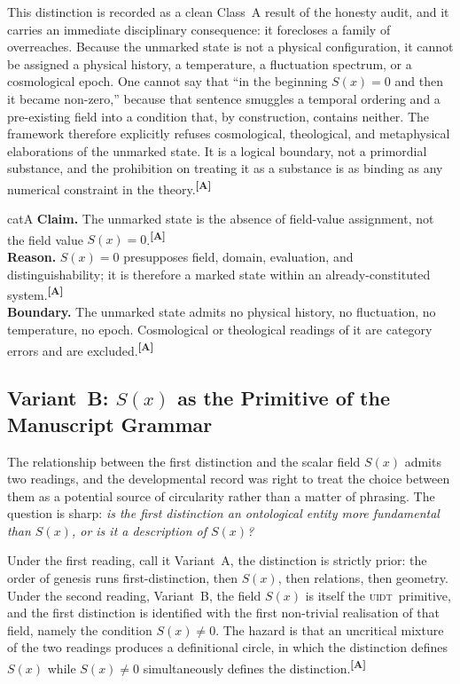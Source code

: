 \documentclass[12pt,a4paper,twoside]{article}
\theoremstyle{plain}
\theoremstyle{definition}
\theoremstyle{remark}
\newcommand{\UIDT}{\textsc{uidt}}
\newcommand{\catmark}[1]{\textsuperscript{\textsf{\textbf{[#1]}}}}
\begin{document}
This distinction is recorded as a clean Class~A result of the honesty audit, and it carries an immediate disciplinary consequence: it forecloses a family of overreaches. Because the unmarked state is not a physical configuration, it cannot be assigned a physical history, a temperature, a fluctuation spectrum, or a cosmological epoch. One cannot say that ``in the beginning $S(x)=0$ and then it became non-zero,'' because that sentence smuggles a temporal ordering and a pre-existing field into a condition that, by construction, contains neither. The framework therefore explicitly refuses cosmological, theological, and metaphysical elaborations of the unmarked state. It is a logical boundary, not a primordial substance, and the prohibition on treating it as a substance is as binding as any numerical constraint in the theory.\catmark{A}
\newpage
\begin{evidencebox}{catA}
\textbf{Claim.} The unmarked state is the absence of field-value assignment, not
the field value $S(x)=0$.\catmark{A}\\[0.3em]
\textbf{Reason.} $S(x)=0$ presupposes field, domain, evaluation, and distinguishability; it is therefore a marked state within an already-constituted
system.\catmark{A}\\[0.3em]
\textbf{Boundary.} The unmarked state admits no physical history, no fluctuation, no temperature, no epoch. Cosmological or theological readings of it are category errors and are excluded.\catmark{A}
\end{evidencebox}

\subsection{Variant~B: \texorpdfstring{$S(x)$}{S(x)} as the Primitive of the Manuscript Grammar}
\label{subsec:variant-b}

The relationship between the first distinction and the scalar field $S(x)$ admits two readings, and the developmental record was right to treat the choice between them as a potential source of circularity rather than a matter of phrasing. The question is sharp: \emph{is the first distinction an ontological entity more fundamental than $S(x)$, or is it a description of $S(x)$?}

Under the first reading, call it Variant~A, the distinction is strictly prior: the order of genesis runs first-distinction, then $S(x)$, then relations, then geometry. Under the second reading, Variant~B, the field $S(x)$ is itself the \UIDT\ primitive, and the first distinction is identified with the first non-trivial realisation of that field, namely the condition $S(x)\neq 0$. The hazard is that an uncritical mixture of the two readings produces a definitional circle, in which the distinction defines $S(x)$ while $S(x)\neq 0$ simultaneously defines the distinction.\catmark{A}
\end{document}
